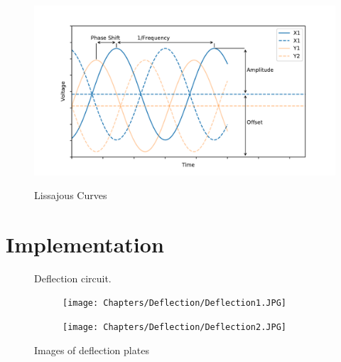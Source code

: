 \begin{figure}[ht]
	\centering
		\includegraphics[width=0.7\linewidth]{Chapters/Deflection/VoltageAspects}
	\caption{}
	\label{fig:VoltageAspects}
\end{figure}


\begin{figure}[ht]
	\centering
	
	\begin{tikzpicture}
		
	\end{tikzpicture}
	
	\caption{Lissajous Curves}
	\label{fig:Lissajous Curves}
\end{figure}

\section{Implementation}

\begin{figure}[ht]
	\centering
	
	\begin{tikzpicture}
		
	\end{tikzpicture}
	\caption{Deflection circuit.}
	\label{fig:deflec_circuit}
\end{figure}

\begin{figure}[ht]
	\centering
	\begin{subfigure}{0.4\textwidth}
		\centering
		\texttt{[image: Chapters/Deflection/Deflection1.JPG]}
		\caption{}
		\label{fig:circuit_phase}
	\end{subfigure}
	\hspace{0.1\textwidth}
	\begin{subfigure}{0.4\textwidth}
		\centering
		\texttt{[image: Chapters/Deflection/Deflection2.JPG]}
		\caption{}
		\label{fig:PCB_phase}
	\end{subfigure}
	\caption{Images of deflection plates}
	\label{fig:PhaseShifter}
\end{figure}


